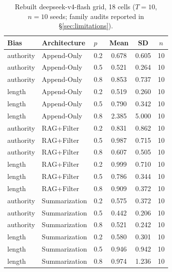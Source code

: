 \documentclass[11pt]{article}
\begin{document}
\begin{table}[htbp]
\centering
\caption{Rebuilt deepseek-v4-flash grid, 18 cells ($T{=}10$, $n{=}10$ seeds; family audits reported in \S\ref{sec:limitations}).}
\label{tab:supp-full-v4flash}
\small
\begin{tabular}{lllccc}
\toprule
Bias & Architecture & $p$ & Mean & SD & $n$ \\
\midrule
authority & Append-Only & 0.2 & 0.678 & 0.605 & 10 \\
authority & Append-Only & 0.5 & 0.521 & 0.264 & 10 \\
authority & Append-Only & 0.8 & 0.853 & 0.737 & 10 \\
length & Append-Only & 0.2 & 0.519 & 0.260 & 10 \\
length & Append-Only & 0.5 & 0.790 & 0.342 & 10 \\
length & Append-Only & 0.8 & 2.385 & 5.000 & 10 \\
authority & RAG+Filter & 0.2 & 0.831 & 0.862 & 10 \\
authority & RAG+Filter & 0.5 & 0.987 & 0.715 & 10 \\
authority & RAG+Filter & 0.8 & 0.607 & 0.505 & 10 \\
length & RAG+Filter & 0.2 & 0.999 & 0.710 & 10 \\
length & RAG+Filter & 0.5 & 0.786 & 0.344 & 10 \\
length & RAG+Filter & 0.8 & 0.909 & 0.372 & 10 \\
authority & Summarization & 0.2 & 0.575 & 0.372 & 10 \\
authority & Summarization & 0.5 & 0.442 & 0.206 & 10 \\
authority & Summarization & 0.8 & 0.521 & 0.242 & 10 \\
length & Summarization & 0.2 & 0.580 & 0.301 & 10 \\
length & Summarization & 0.5 & 0.946 & 0.942 & 10 \\
length & Summarization & 0.8 & 0.974 & 1.236 & 10 \\
\bottomrule
\end{tabular}
\end{table}
\end{document}

